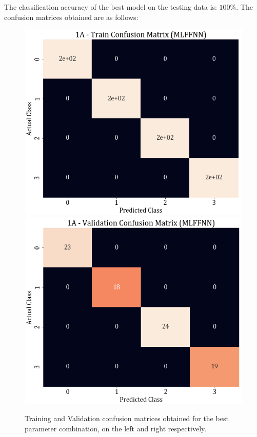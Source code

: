 \documentclass[11pt,a4paper]{article}
\newcommand{\noi}{\noindent}
\begin{document}
\noi
The classification accuracy of the best model on the testing data is: $100\%$. The confusion matrices obtained are as follows:
\begin{figure}[H]
    \centering
    \includegraphics[scale=0.4]{images/1A_MLFFNN_train_confmat.png}
    \includegraphics[scale=0.4]{images/1A_MLFFNN_val_confmat.png}
    \caption{Training and Validation confusion matrices obtained for the best parameter combination, on the left and right respectively.}
\end{figure}
\end{document}
